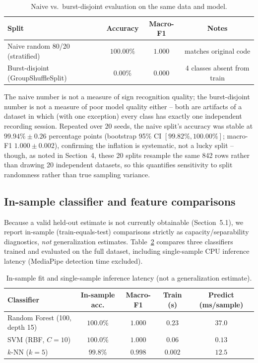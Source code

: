 \documentclass[runningheads]{llncs}
\begin{document}
\begin{table}[t]
\centering
\caption{Naive vs.\ burst-disjoint evaluation on the same data and model.}
\label{tab:leakage}
\begin{tabular}{lccc}
\toprule
Split & Accuracy & Macro-F1 & Notes \\
\midrule
Naive random 80/20 (stratified) & $100.00\%$ & $1.000$ & matches original code \\
Burst-disjoint (GroupShuffleSplit) & $0.00\%$ & $0.000$ &
4 classes absent from train \\
\bottomrule
\end{tabular}
\end{table}

The naive number is not a measure of sign recognition quality; the
burst-disjoint number is not a measure of poor model quality either --
both are artifacts of a dataset in which (with one exception) every class
has exactly one independent recording session. Repeated over 20 seeds,
the naive split's accuracy was stable at $99.94\% \pm 0.26$ percentage
points (bootstrap 95\% CI $[99.82\%, 100.00\%]$; macro-F1 $1.000 \pm
0.002$), confirming the inflation is systematic, not a lucky split --
though, as noted in Section~4, these 20 splits resample the same 842
rows rather than drawing 20 independent datasets, so this quantifies
sensitivity to split randomness rather than true sampling variance.

\subsection{In-sample classifier and feature comparisons}

Because a valid held-out estimate is not currently obtainable (Section~5.1),
we report in-sample (train-equals-test) comparisons strictly as
capacity/separability diagnostics, \emph{not} generalization estimates.
Table~\ref{tab:classifiers} compares three classifiers trained and
evaluated on the full dataset, including single-sample CPU inference
latency (MediaPipe detection time excluded).

\begin{table}[t]
\centering
\caption{In-sample fit and single-sample inference latency (not a
generalization estimate).}
\label{tab:classifiers}
\begin{tabular}{lcccc}
\toprule
Classifier & In-sample acc. & Macro-F1 & Train (s) & Predict (ms/sample) \\
\midrule
Random Forest (100, depth 15) & $100.0\%$ & $1.000$ & $0.23$ & $37.0$ \\
SVM (RBF, $C{=}10$) & $100.0\%$ & $1.000$ & $0.06$ & $0.13$ \\
$k$-NN ($k{=}5$) & $99.8\%$ & $0.998$ & $0.002$ & $12.5$ \\
\bottomrule
\end{tabular}
\end{table}
\end{document}
